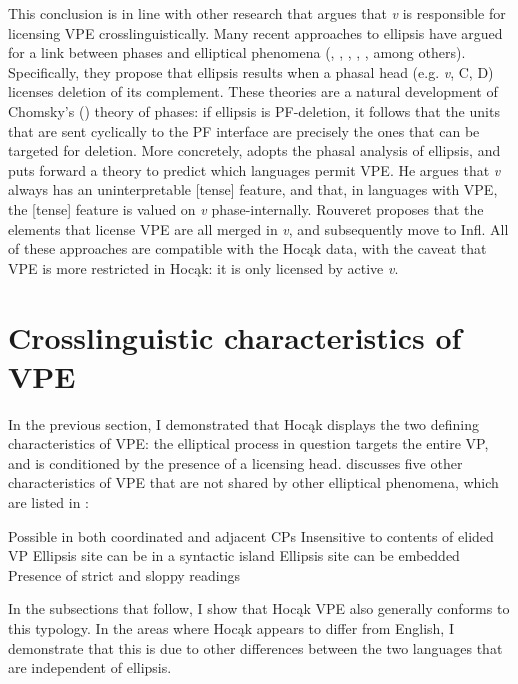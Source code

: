 \documentclass[output=paper]{LSP/langsci}
\begin{document}
This conclusion is in line with other research that argues that \emph{v} is responsible for licensing VPE crosslinguistically. Many recent approaches to ellipsis have argued for a link between phases and elliptical phenomena (\citealt{Holmberg2001}, \citealt{vanCraenenbroeck2004}, \citealt{Gengel2007},  \citealt{YoshidaGallego2008}, \citealt{Gallego2009}, among others). Specifically, they propose that ellipsis results when a phasal head (e.g. \emph{v}, C, D) licenses deletion of its complement. These theories are a natural development of Chomsky's (\citeyear{Chomsky2000,Chomsky2001b,Chomsky2004}) theory of phases: if ellipsis is PF-deletion, it follows that the units that are sent cyclically to the PF interface are precisely the ones that can be targeted for deletion. More concretely, \citet{Rouveret2012} adopts the phasal analysis of ellipsis, and puts forward a theory to predict which languages permit VPE. He argues that \emph{v} always has an uninterpretable [tense] feature, and that, in languages with VPE, the [tense] feature is valued on \emph{v} phase-internally. Rouveret proposes that the elements that license VPE are all merged in \emph{v}, and subsequently move to Infl. All of these approaches are compatible with the Hocąk data, with the caveat that VPE is more restricted in Hocąk: it is only licensed by active \emph{v}.


\section{Crosslinguistic characteristics of VPE}\label{sec:johnson:3}

In the previous section, I demonstrated that Hocąk displays the two defining characteristics of VPE: the elliptical process in question targets the entire VP, and is conditioned by the presence of a licensing head. \citet{Goldberg2005} discusses five other characteristics of VPE that are not shared by other elliptical phenomena, which are listed in : 

\ea\label{ex:johnson:24}
\ea
Possible in both coordinated and adjacent CPs
\ex
Insensitive to contents of elided VP
\ex
Ellipsis site can be in a syntactic island
\ex
Ellipsis site can be embedded
\ex
Presence of strict and sloppy readings
\z
\z


In the subsections that follow, I show that Hocąk VPE also generally conforms to this typology. In the areas where Hocąk appears to differ from English, I demonstrate that this is due to other differences between the two languages that are independent of ellipsis.
\end{document}
